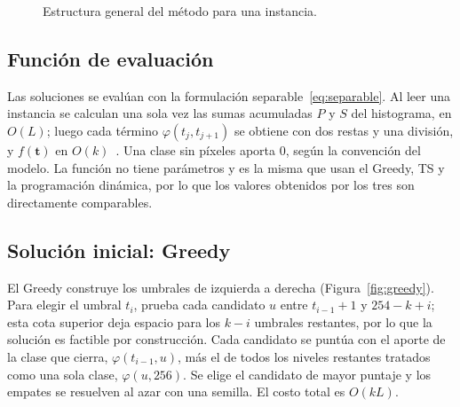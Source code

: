 \documentclass[letter, 10pt]{article}
\begin{document}
\begin{figure}[h]
    \centering
    \caption{Estructura general del método para una instancia.}
    \label{fig:flujo}
\end{figure}

\subsection{Función de evaluación}
Las soluciones se evalúan con la formulación separable~\eqref{eq:separable}. Al leer una instancia se calculan una sola vez las sumas acumuladas $P$ y $S$ del histograma, en $O(L)$; luego cada término $\varphi(t_j, t_{j+1})$ se obtiene con dos restas y una división, y $f(\mathbf{t})$ en $O(k)$~\cite{Liao2001Fast}. Una clase sin píxeles aporta 0, según la convención del modelo. La función no tiene parámetros y es la misma que usan el Greedy, TS y la programación dinámica, por lo que los valores obtenidos por los tres son directamente comparables.

\subsection{Solución inicial: Greedy}
El Greedy construye los umbrales de izquierda a derecha (Figura~\ref{fig:greedy}). Para elegir el umbral $t_i$, prueba cada candidato $u$ entre $t_{i-1} + 1$ y $254 - k + i$; esta cota superior deja espacio para los $k - i$ umbrales restantes, por lo que la solución es factible por construcción. Cada candidato se puntúa con el aporte de la clase que cierra, $\varphi(t_{i-1}, u)$, más el de todos los niveles restantes tratados como una sola clase, $\varphi(u, 256)$. Se elige el candidato de mayor puntaje y los empates se resuelven al azar con una semilla. El costo total es $O(kL)$.
\end{document}
